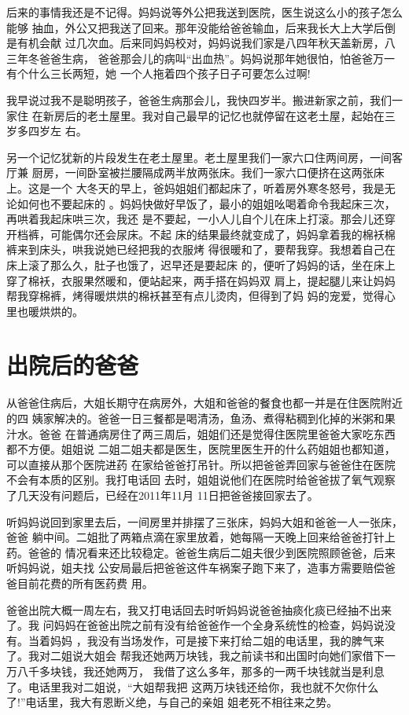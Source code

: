 \documentclass[12pt]{book}
\begin{document}
后来的事情我还是不记得。妈妈说等外公把我送到医院，医生说这么小的孩子怎么能够
抽血，外公又把我送了回来。那年没能给爸爸输血，后来我长大上大学后倒是有机会献
过几次血。后来同妈妈校对，妈妈说我们家是八四年秋天盖新房，八三年冬爸爸生病，
爸爸那会儿的病叫“出血热”。妈妈说那年她很怕，怕爸爸万一有个什么三长两短，她
一个人拖着四个孩子日子可要怎么过啊!

我早说过我不是聪明孩子，爸爸生病那会儿，我快四岁半。搬进新家之前，我们一家住
在新房后的老土屋里。我对自己最早的记忆也就停留在这老土屋，起始在三岁多四岁左
右。

另一个记忆犹新的片段发生在老土屋里。老土屋里我们一家六口住两间房，一间客厅兼
厨房，一间卧室被拦腰隔成两半放两张床。我们一家六口便挤在这两张床上。这是一个
大冬天的早上，爸妈姐姐们都起床了，听着房外寒冬怒号，我是无论如何也不要起床的
。妈妈快做好早饭了，最小的姐姐吆喝着命令我起床三次，再哄着我起床哄三次，我还
是不要起，一小人儿自个儿在床上打滚。那会儿还穿开档裤，可能偶尔还会尿床。不起
床的结果最终就变成了，妈妈拿着我的棉袄棉裤来到床头，哄我说她已经把我的衣服烤
得很暖和了，要帮我穿。我想着自己在床上滚了那么久，肚子也饿了，迟早还是要起床
的，便听了妈妈的话，坐在床上穿了棉袄，衣服果然暖和，便站起来，两手搭在妈妈双
肩上，提起腿儿来让妈妈帮我穿棉裤，烤得暖烘烘的棉袄甚至有点儿烫肉，但得到了妈
妈的宠爱，觉得心里也暖烘烘的。
\section{出院后的爸爸}
\label{sec-9-14}

从爸爸住病后，大姐长期守在病房外，大姐和爸爸的餐食也都一并是在住医院附近的四
姨家解决的。爸爸一日三餐都是喝清汤，鱼汤、煮得粘稠到化掉的米粥和果汁水。爸爸
在普通病房住了两三周后，姐姐们还是觉得住医院里爸爸大家吃东西都不方便。姐姐说
二姐二姐夫都是医生，医院里医生开的什么药姐姐也都知道，可以直接从那个医院进药
在家给爸爸打吊针。所以把爸爸弄回家与爸爸住在医院不会有本质的区别。我打电话回
去时，姐姐说他们在医院时给爸爸拔了氧气观察了几天没有问题后，已经在2011年11月
11日把爸爸接回家去了。

听妈妈说回到家里去后，一间房里并排摆了三张床，妈妈大姐和爸爸一人一张床，爸爸
躺中间。二姐批了两箱点滴在家里放着，她每隔一天晚上回来给爸爸打针上药。爸爸的
情况看来还比较稳定。爸爸生病后二姐夫很少到医院照顾爸爸，后来听妈妈说，姐夫找
公安局最后把爸爸这件车祸案子跑下来了，造事方需要赔偿爸爸目前花费的所有医药费
用。

爸爸出院大概一周左右，我又打电话回去时听妈妈说爸爸抽痰化痰已经抽不出来了。我
问妈妈在爸爸出院之前有没有给爸爸作一个全身系统性的检查，妈妈说没有。当着妈妈
，我没有当场发作，可是接下来打给二姐的电话里，我的脾气来了。我对二姐说大姐会
帮我还她两万块钱，我之前读书和出国时向她们家借下一万八千多块钱，我还她两万，
我借了这么多年，那多的一两千块钱就当是利息了。电话里我对二姐说，“大姐帮我把
这两万块钱还给你，我也就不欠你什么了!”电话里，我大有恩断义绝，与自己的亲姐
姐老死不相往来之势。
\end{document}
